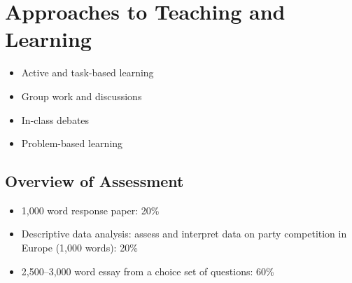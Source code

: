 \documentclass[abstract=on,parskip=full,headings=standardclasses,fontsize=11pt,paper=a4]{scrartcl}
\begin{document}
\section*{Approaches to Teaching and Learning}

\begin{itemize}
\item Active and task-based learning
\item Group work and discussions
\item In-class debates
\item Problem-based learning
\end{itemize}






\subsection*{Overview of Assessment}

\begin{itemize}
\item 1,000 word response paper: 20\% 
\item Descriptive data analysis: assess and interpret data on party competition in Europe (1,000 words): 20\%
\item 2,500--3,000 word essay from a choice set of questions: 60\%
\end{itemize}
\end{document}
